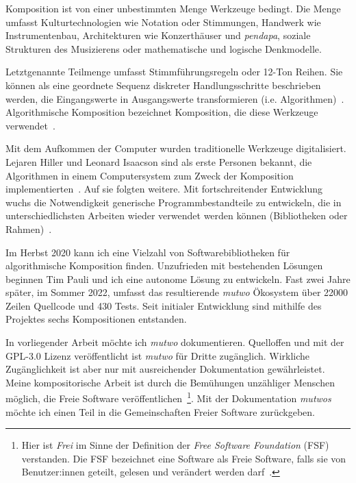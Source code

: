 \documentclass[12pt,a4paper,ngerman]{article}
\begin{document}
\noindent
Komposition ist von einer unbestimmten Menge Werkzeuge bedingt.
Die Menge umfasst Kulturtechnologien wie Notation oder Stimmungen, Handwerk wie Instrumentenbau, Architekturen wie Konzerthäuser und \emph{pendapa}, soziale Strukturen des Musizierens oder mathematische und logische Denkmodelle.

\bigskip

\noindent
Letztgenannte Teilmenge umfasst Stimmführungsregeln oder 12-Ton Reihen.
Sie können als eine geordnete Sequenz diskreter Handlungsschritte beschrieben werden, die Eingangswerte in Ausgangswerte transformieren (i.e. Algorithmen)~\parencite[S. 3]{introductionToAlgorithms}.
Algorithmische Komposition bezeichnet Komposition, die diese Werkzeuge verwendet~\parencite[S. 1]{algorithmicCompositionParadigms}.

\bigskip

\noindent
Mit dem Aufkommen der Computer wurden traditionelle Werkzeuge digitalisiert.
Lejaren Hiller und Leonard Isaacson sind als erste Personen bekannt, die Algorithmen in einem Computersystem zum Zweck der Komposition implementierten~\parencite[S. 63]{algorithmicCompositionParadigms}.
Auf sie folgten weitere.
Mit fortschreitender Entwicklung wuchs die Notwendigkeit generische Programmbestandteile zu entwickeln, die in unterschiedlichsten Arbeiten wieder verwendet werden können (Bibliotheken oder Rahmen)~\parencite[S. 78]{paradigmsAndComputerMusic}.

\bigskip

\noindent
Im Herbst 2020 kann ich eine Vielzahl von Softwarebibliotheken für algorithmische Komposition finden.
Unzufrieden mit bestehenden Lösungen beginnen Tim Pauli und ich eine autonome Lösung zu entwickeln.
Fast zwei Jahre später, im Sommer 2022, umfasst das resultierende \emph{mutwo} Ökosystem über 22000 Zeilen Quellcode und 430 Tests.
Seit initialer Entwicklung sind mithilfe des Projektes sechs Kompositionen entstanden.

\bigskip

\noindent
In vorliegender Arbeit möchte ich \emph{mutwo} dokumentieren.
Quelloffen und mit der GPL-3.0 Lizenz veröffentlicht ist \emph{mutwo} für Dritte zugänglich.
Wirkliche Zugänglichkeit ist aber nur mit ausreichender Dokumentation gewährleistet.
Meine kompositorische Arbeit ist durch die Bemühungen unzähliger Menschen möglich, die Freie Software veröffentlichen~\footnote{Hier ist \emph{Frei} im Sinne der Definition der \emph{Free Software Foundation} (FSF) verstanden. Die FSF bezeichnet eine Software als Freie Software, falls sie von Benutzer:innen geteilt, gelesen und verändert werden darf~\parencite{freeSoftwareDefinition}.}.
Mit der Dokumentation \emph{mutwos} möchte ich einen Teil in die Gemeinschaften Freier Software zurückgeben.
\end{document}
